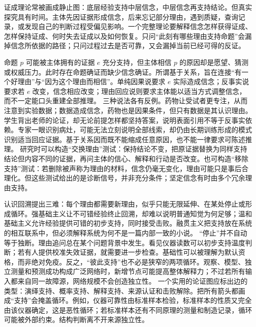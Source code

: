 证成理论常被画成静止图：底层经验支持中层信念，中层信念再支持结论。但真实探究具有时间。主体先因证据形成信念，后来忘记部分理由，遇到质疑，查询记录，或发现自己的判断过程受偏见影响。一个完整理论要解释信念怎样获得证成、怎样保持证成、何时失去证成以及如何恢复。只问“此刻有哪些理由支持命题”会漏掉信念所依据的路径；只问过程过去是否可靠，又会漏掉当前已经可得的反证。

命题 \(p\) 可能被主体拥有的证据 \(e\) 充分支持，但主体相信 \(p\) 的原因却是愿望、猜测或权威压力。此时存在命题确证而缺少信念确证。所谓基于关系，旨在连接“有一个好理由”与“因为这个理由而相信”。单纯因果说要求 \(e\) 实际造成信念；反事实说要求若 \(e\) 改变，信念相应改变；理由回应说则要求主体能以适当方式调整信念，而不一定能口头重建全部推理。 三种说法各有反例。药物让受试者更专注，从而注意到实验数据；数据造成信念，药物也是因果条件，但只有数据是其认识理由。学生背出老师的论证，却无论前提怎样都坚持答案，说明表面引用不等于反事实依赖。专家一眼识别病灶，可能无法立刻说明全部线索，却仍由长期训练形成的模式识别适当回应证据。基于关系因而既不能缩成任意原因，也不能一律要求可陈述推理。 研究时可以构造“交换理由”测试：保持结论不变，把原证据替换为同样支持结论但内容不同的证据，再问主体的信心、解释和行动是否改变。也可构造“移除支持”测试：若删除被声称为理由的材料，信念仍毫无变化，理由可能只是事后合理化。但这些测试给出的是诊断信号，并非充分条件；坚定信念有时由多个冗余理由支持。

认识回溯提出三难：每个理由都需要新理由，似乎只能无限延伸、在某处停止或形成循环。强基础主义让不可错经验终止回溯，却难以说明普通知觉为何足够；温和基础主义允许经验提供可错的初步支持，同时接受击败。融贯主义把支持放在系统的相互联系中，但必须解释系统为何不是一篇内部一致的小说。\parencite{bonjour1985} “停止”并不自动等于独断。理由追问总在某个问题背景中发生。看见仪器读数可以初步支持温度判断；若有人提供校准失效证据，就需要进一步检查。基础性可以被理解为默认资格，而非绝对免疫。反之，“彼此支持”也不必是狭窄的两项循环。观察、模型、独立测量和预测成功构成广泛网络时，新增节点可能提高整体解释力；不过若所有输入都来自同一故障源，网络规模不会创造独立性。 一个实用的论证图应标出边的类型：演绎支持、概率支持、解释支持、来源认证和击败解除。把所有箭头都画成“支持”会掩盖循环。例如，仪器可靠性由标准样本检验，标准样本的性质又完全由该仪器确定，这是恶性循环；若标准样本还有不同原理的测量和制造记录，循环可能被外部约束。结构判断离不开来源独立性。

